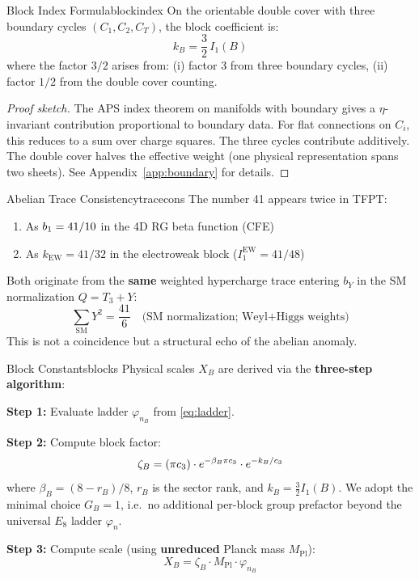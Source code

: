 \begin{theorem}{Block Index Formula}{blockindex}
On the orientable double cover with three boundary cycles $(C_1, C_2, C_T)$, 
the block coefficient is:
\begin{equation}
    k_B = \frac{3}{2}\, I_1(B)
\end{equation}
where the factor $3/2$ arises from: (i) factor 3 from three boundary cycles, 
(ii) factor $1/2$ from the double cover counting.
\end{theorem}

\begin{proof}[Proof sketch]
The APS index theorem on manifolds with boundary gives a $\eta$-invariant 
contribution proportional to boundary data. For flat connections on $C_i$, 
this reduces to a sum over charge squares. The three cycles contribute 
additively. The double cover halves the effective weight (one physical 
representation spans two sheets). See Appendix~\ref{app:boundary} for details.
\end{proof}

\begin{corollary}{Abelian Trace Consistency}{tracecons}
The number 41 appears twice in TFPT:
\begin{enumerate}[leftmargin=1.5em, topsep=2pt, itemsep=1pt]
    \item As $b_1 = 41/10$ in the 4D RG beta function (CFE)
    \item As $k_{\text{EW}} = 41/32$ in the electroweak block ($I_1^{\text{EW}} = 41/48$)
\end{enumerate}
Both originate from the \textbf{same} weighted hypercharge trace entering $b_Y$ in the
SM normalization $Q=T_3+Y$:
\begin{equation}
    \sum_{\text{SM}} Y^2 = \frac{41}{6} \quad \text{(SM normalization; Weyl+Higgs weights)}
\end{equation}
This is not a coincidence but a structural echo of the abelian anomaly.
\end{corollary}

\begin{definition}{Block Constants}{blocks}
Physical scales $X_B$ are derived via the \textbf{three-step algorithm}:

\textbf{Step 1:} Evaluate ladder $\varphi_{n_B}$ from \eqref{eq:ladder}.

\textbf{Step 2:} Compute block factor:
\begin{equation}
    \zeta_B = (\pi c_3) \cdot e^{-\beta_B\pi c_3} 
        \cdot e^{-k_B/c_3}
\end{equation}
where $\beta_B = (8 - r_B)/8$, $r_B$ is the sector rank, and $k_B = \frac{3}{2}I_1(B)$.
We adopt the minimal choice $G_B=1$, i.e.\ no additional per-block group prefactor beyond the universal $E_8$ ladder $\varphi_n$.

\textbf{Step 3:} Compute scale (using \textbf{unreduced} Planck mass $M_{\mathrm{Pl}}$):
\begin{equation}
    X_B = \zeta_B \cdot M_{\mathrm{Pl}} \cdot \varphi_{n_B}
\end{equation}
\end{definition}

